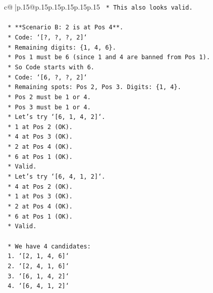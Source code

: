 \documentclass{article}
\begin{document}
{\begin{supertabular}{c@{$\;$}|p{.15\linewidth}@{}p{.15\linewidth}p{.15\linewidth}p{.15\linewidth}p{.15\linewidth}p{.15\linewidth}}
{{{\texttt{                    *   This also looks valid.} \\
\\ 
\texttt{        *   **Scenario B: 2 is at Pos 4**.} \\
\texttt{            *   Code: `{[}?, ?, ?, 2{]}`} \\
\texttt{            *   Remaining digits: \{1, 4, 6\}.} \\
\texttt{            *   Pos 1 must be 6 (since 1 and 4 are banned from Pos 1).} \\
\texttt{                *   So Code starts with 6.} \\
\texttt{            *   Code: `{[}6, ?, ?, 2{]}`} \\
\texttt{            *   Remaining spots: Pos 2, Pos 3. Digits: \{1, 4\}.} \\
\texttt{            *   Pos 2 must be 1 or 4.} \\
\texttt{            *   Pos 3 must be 1 or 4.} \\
\texttt{            *   Let's try `{[}6, 1, 4, 2{]}`.} \\
\texttt{                *   1 at Pos 2 (OK).} \\
\texttt{                *   4 at Pos 3 (OK).} \\
\texttt{                *   2 at Pos 4 (OK).} \\
\texttt{                *   6 at Pos 1 (OK).} \\
\texttt{                *   Valid.} \\
\texttt{            *   Let's try `{[}6, 4, 1, 2{]}`.} \\
\texttt{                *   4 at Pos 2 (OK).} \\
\texttt{                *   1 at Pos 3 (OK).} \\
\texttt{                *   2 at Pos 4 (OK).} \\
\texttt{                *   6 at Pos 1 (OK).} \\
\texttt{                *   Valid.} \\
\\ 
\texttt{    *   We have 4 candidates:} \\
\texttt{        1.  `{[}2, 1, 4, 6{]}`} \\
\texttt{        2.  `{[}2, 4, 1, 6{]}`} \\
\texttt{        3.  `{[}6, 1, 4, 2{]}`} \\
\texttt{        4.  `{[}6, 4, 1, 2{]}`} \\
\\ 
}}}
\end{supertabular}}
\end{document}
